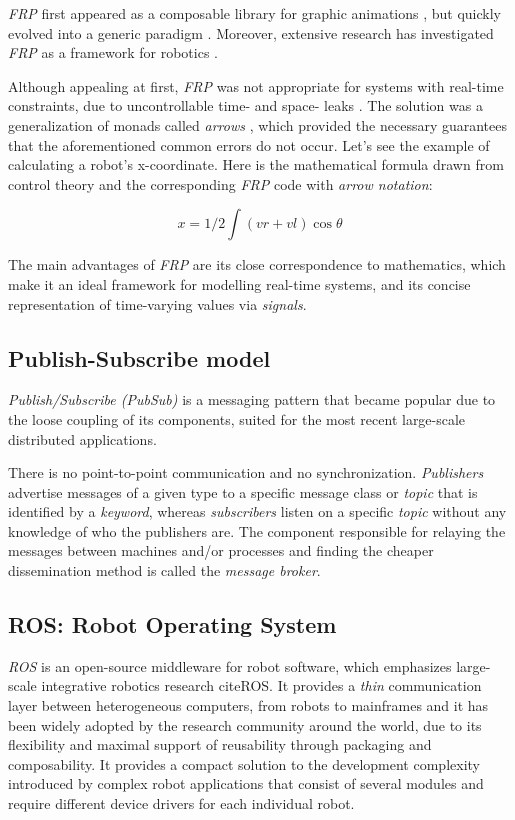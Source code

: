 \documentclass[sigplan,review,anonymous]{acmart}
\begin{document}
\textit{FRP} first appeared as a composable library for graphic animations
\cite{fran}, but quickly evolved into a generic paradigm
\cite{survey_frp,real_frp,pushpull_frp}. Moreover, extensive research has
investigated \textit{FRP} as a framework for robotics
\cite{arrows_robots,lambda_in_motion}.

Although appealing at first, \textit{FRP} was not appropriate for systems  with
real-time constraints, due to uncontrollable time- and space- leaks
\cite{event_frp}. The solution was a generalization of monads called
\textit{arrows} \cite{arrows}, which provided the necessary guarantees that the
aforementioned common errors do not occur. Let's see the example of calculating
a robot's x-coordinate. Here is the mathematical formula drawn from control
theory and the corresponding \textit{FRP} code with \textit{arrow notation}\cite{arrows_notation}:

$$ x = 1/2 \int (vr + vl) \cos\theta $$


The main advantages of \textit{FRP} are its close correspondence to
mathematics\cite{survey_frp}, which make it an ideal framework for modelling
real-time systems, and its concise representation of time-varying values via
\textit{signals}.

\subsection{Publish-Subscribe model}

\textit{Publish/Subscribe (PubSub)} is a messaging pattern that became popular
due to the loose coupling of its components, suited for the most recent
large-scale distributed applications.

There is no point-to-point communication and no synchronization.
\textit{Publishers} advertise messages of a given type to a specific message
class or \textit{topic} that is identified by a \textit{keyword}, whereas
\textit{subscribers} listen on a specific \textit{topic} without any knowledge
of who the publishers are. The component responsible for relaying the messages
between machines and/or processes and finding the cheaper dissemination method
is called the \textit{message broker}.

\subsection{ROS: Robot Operating System}

\textit{ROS} is an open-source middleware for robot software, which emphasizes
large-scale integrative robotics research cite{ROS}. It provides a \textit{thin}
communication layer between heterogeneous computers, from robots to mainframes
and it has been widely adopted by the research community around the world, due
to its flexibility and maximal support of reusability through packaging and
composability. It provides a compact solution to the development complexity
introduced by complex robot applications that consist of several modules and
require different device drivers for each individual robot.
\end{document}

